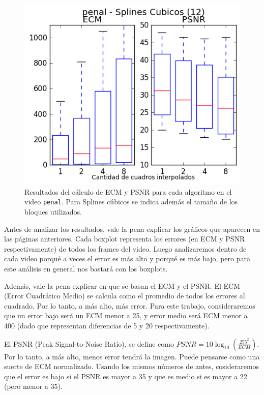 \begin{figure}[H]
\begin{minipage}{0.33\textwidth}
    \includegraphics[width=1\textwidth]{imgs/resultados_error/penal_4.png} 
\end{minipage}
\label{fig:errpenal}
\caption{\footnotesize Resultados del cálculo de ECM y PSNR para cada algoritmo en el video \texttt{penal}. Para Splines cúbicos se indica además el tamaño de los bloques utilizados.}
\end{figure}

Antes de analizar los resultados, vale la pena explicar los gráficos que aparecen en las páginas anteriores. Cada boxplot representa los errores (en ECM y PSNR respectivamente) de todos los frames del video. Luego analizaremos dentro de cada video porqu\'e a veces el error es más alto y porqu\'e es más bajo, pero para este análisis en general nos bastará con los boxplots.

Además, vale la pena explicar en que se basan el ECM y el PSNR. El ECM (Error Cuadrático Medio) se calcula como el promedio de todos los errores al cuadrado. Por lo tanto, a más alto, más error. Para este trabajo, consideraremos que un error bajo será un ECM menor a 25, y error medio será ECM menor a 400 (dado que representan diferencias de 5 y 20 respectivamente).

El PSNR (Peak Signal-to-Noise Ratio), se define como $PSNR = 10 \log_{10}(\frac{255^2}{ECM})$. Por lo tanto, a más alto, menos error tendrá la imagen. Puede pensarse como una suerte de ECM normalizado. Usando los mismos números de antes, cosideraremos que el error es bajo si el PSNR es mayor a 35 y que es medio si es mayor a 22 (pero menor a 35).

